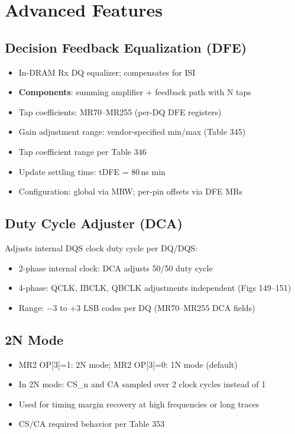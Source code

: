 \documentclass[10pt,a4paper,twoside]{article}
\begin{document}
\section{Advanced Features}

\subsection{Decision Feedback Equalization (DFE)}

\begin{itemize}
  \item In-DRAM Rx DQ equalizer; compensates for ISI
  \item \textbf{Components}: summing amplifier + feedback path with N taps
  \item Tap coefficients: MR70--MR255 (per-DQ DFE registers)
  \item Gain adjustment range: vendor-specified min/max (Table 345)
  \item Tap coefficient range per Table 346
  \item Update settling time: tDFE = 80\,ns min
  \item Configuration: global via MRW; per-pin offsets via DFE MRs
\end{itemize}

\subsection{Duty Cycle Adjuster (DCA)}

Adjusts internal DQS clock duty cycle per DQ/DQS:
\begin{itemize}
  \item 2-phase internal clock: DCA adjusts 50/50 duty cycle
  \item 4-phase: QCLK, IBCLK, QBCLK adjustments independent (Figs 149--151)
  \item Range: $-3$ to $+3$ LSB codes per DQ (MR70--MR255 DCA fields)
\end{itemize}

\subsection{2N Mode}

\begin{itemize}
  \item MR2 OP[3]=1: 2N mode; MR2 OP[3]=0: 1N mode (default)
  \item In 2N mode: CS\_n and CA sampled over 2 clock cycles instead of 1
  \item Used for timing margin recovery at high frequencies or long traces
  \item CS/CA required behavior per Table 353
\end{itemize}
\end{document}
